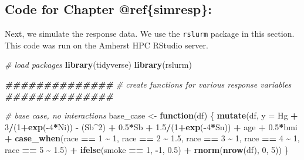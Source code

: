 \documentclass[12pt, twoside]{amherstthesis}
\newenvironment{Shaded}{\begin{snugshade}}{\end{snugshade}}
\newcommand{\AttributeTok}[1]{\textcolor[rgb]{0.13,0.29,0.53}{#1}}
\newcommand{\CommentTok}[1]{\textcolor[rgb]{0.56,0.35,0.01}{\textit{#1}}}
\newcommand{\ControlFlowTok}[1]{\textcolor[rgb]{0.13,0.29,0.53}{\textbf{#1}}}
\newcommand{\DecValTok}[1]{\textcolor[rgb]{0.00,0.00,0.81}{#1}}
\newcommand{\DocumentationTok}[1]{\textcolor[rgb]{0.56,0.35,0.01}{\textbf{\textit{#1}}}}
\newcommand{\FloatTok}[1]{\textcolor[rgb]{0.00,0.00,0.81}{#1}}
\newcommand{\FunctionTok}[1]{\textcolor[rgb]{0.13,0.29,0.53}{\textbf{#1}}}
\newcommand{\NormalTok}[1]{#1}
\newcommand{\OtherTok}[1]{\textcolor[rgb]{0.56,0.35,0.01}{#1}}
\newcommand{\SpecialCharTok}[1]{\textcolor[rgb]{0.81,0.36,0.00}{\textbf{#1}}}
\begin{document}
\hypertarget{code-for-chapter-refsimresp}{%
\subsection{Code for Chapter @ref\{simresp\}:}\label{code-for-chapter-refsimresp}}

Next, we simulate the response data. We use the \texttt{rslurm} package in this section. This code was run on the Amherst HPC RStudio server.
\begin{Shaded}
\begin{Highlighting}[]
\CommentTok{\# load packages}
\FunctionTok{library}\NormalTok{(tidyverse)}
\FunctionTok{library}\NormalTok{(rslurm)}
\end{Highlighting}
\end{Shaded}
\begin{Shaded}
\begin{Highlighting}[]
\DocumentationTok{\#\#\#\#\#\#\#\#\#\#\#\#\#\#}
\CommentTok{\# create functions for various response variables}
\DocumentationTok{\#\#\#\#\#\#\#\#\#\#\#\#\#\#}

\CommentTok{\# base case, no interactions}
\NormalTok{base\_case }\OtherTok{\textless{}{-}} \ControlFlowTok{function}\NormalTok{(df) \{}
  \FunctionTok{mutate}\NormalTok{(df, }\AttributeTok{y =} 
\NormalTok{           Hg }\SpecialCharTok{+} \DecValTok{3}\SpecialCharTok{/}\NormalTok{(}\DecValTok{1}\SpecialCharTok{+}\FunctionTok{exp}\NormalTok{(}\SpecialCharTok{{-}}\DecValTok{4}\SpecialCharTok{*}\NormalTok{Ni)) }\SpecialCharTok{{-}}\NormalTok{ (Sb}\SpecialCharTok{\^{}}\DecValTok{2}\NormalTok{) }\SpecialCharTok{+} \FloatTok{0.5}\SpecialCharTok{*}\NormalTok{Sb }\SpecialCharTok{+} \FloatTok{1.5}\SpecialCharTok{/}\NormalTok{(}\DecValTok{1}\SpecialCharTok{+}\FunctionTok{exp}\NormalTok{(}\SpecialCharTok{{-}}\DecValTok{4}\SpecialCharTok{*}\NormalTok{Sn)) }\SpecialCharTok{+} 
\NormalTok{           age }\SpecialCharTok{+} \FloatTok{0.5}\SpecialCharTok{*}\NormalTok{bmi }\SpecialCharTok{+} 
           \FunctionTok{case\_when}\NormalTok{(race }\SpecialCharTok{==} \DecValTok{1} \SpecialCharTok{\textasciitilde{}} \DecValTok{1}\NormalTok{, }
\NormalTok{                     race }\SpecialCharTok{==} \DecValTok{2} \SpecialCharTok{\textasciitilde{}} \FloatTok{1.5}\NormalTok{, }
\NormalTok{                     race }\SpecialCharTok{==} \DecValTok{3} \SpecialCharTok{\textasciitilde{}} \DecValTok{1}\NormalTok{, }
\NormalTok{                     race }\SpecialCharTok{==} \DecValTok{4} \SpecialCharTok{\textasciitilde{}} \DecValTok{1}\NormalTok{, }
\NormalTok{                     race }\SpecialCharTok{==} \DecValTok{5} \SpecialCharTok{\textasciitilde{}} \FloatTok{1.5}\NormalTok{) }\SpecialCharTok{+}
           \FunctionTok{ifelse}\NormalTok{(smoke }\SpecialCharTok{==} \DecValTok{1}\NormalTok{, }\SpecialCharTok{{-}}\DecValTok{1}\NormalTok{, }\FloatTok{0.5}\NormalTok{) }\SpecialCharTok{+}
           \FunctionTok{rnorm}\NormalTok{(}\FunctionTok{nrow}\NormalTok{(df), }\DecValTok{0}\NormalTok{, }\DecValTok{5}\NormalTok{))}
\NormalTok{\}}


\end{Highlighting}
\end{Shaded}
\end{document}
